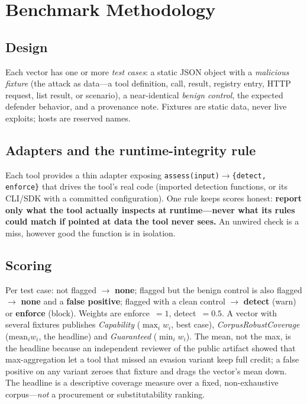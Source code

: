 \documentclass[conference]{IEEEtran}
\begin{document}
\begin{table}[t]
\caption{Inter-rater agreement, Rater A (primary) vs.\ Rater B (blind), \nOrig{} vectors, pre-adjudication.}
\label{tab:agreement}
\centering\scriptsize
\resizebox{\columnwidth}{!}{}
\end{table}

\section{Benchmark Methodology}\label{sec:method}
\subsection{Design}
Each vector has one or more \emph{test cases}: a static JSON object with a \emph{malicious fixture} (the attack as data---a tool definition, call, result, registry entry, HTTP request, list result, or scenario), a near-identical \emph{benign control}, the expected defender behavior, and a provenance note. Fixtures are static data, never live exploits; hosts are reserved names.

\subsection{Adapters and the runtime-integrity rule}
Each tool provides a thin adapter exposing \texttt{assess(input)}$\rightarrow$\texttt{\{detect, enforce\}} that drives the tool's real code (imported detection functions, or its CLI/SDK with a committed configuration). One rule keeps scores honest: \textbf{report only what the tool actually inspects at runtime---never what its rules could match if pointed at data the tool never sees.} An unwired check is a miss, however good the function is in isolation.

\subsection{Scoring}
Per test case: not flagged $\rightarrow$ \textbf{none}; flagged but the benign control is also flagged $\rightarrow$ \textbf{none} and a \textbf{false positive}; flagged with a clean control $\rightarrow$ \textbf{detect} (warn) or \textbf{enforce} (block). Weights are enforce~$=1$, detect~$=0.5$. A vector with several fixtures publishes \emph{Capability} ($\max_i w_i$, best case), \emph{CorpusRobustCoverage} ($\mathrm{mean}_i w_i$, the headline) and \emph{Guaranteed} ($\min_i w_i$). The mean, not the max, is the headline because an independent reviewer of the public artifact showed that max-aggregation let a tool that missed an evasion variant keep full credit; a false positive on any variant zeroes that fixture and drags the vector's mean down. The headline is a descriptive coverage measure over a fixed, non-exhaustive corpus---\emph{not} a procurement or substitutability ranking.
\end{document}
